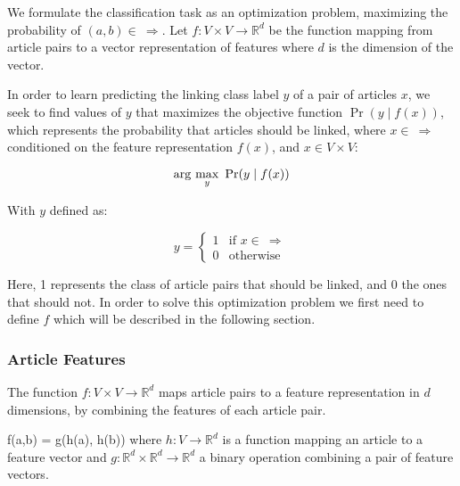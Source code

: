 We formulate the classification task as an optimization problem, maximizing the probability of $(a,b) \in \ \Rightarrow$. Let $f: V\times V \to \mathbb{R}^d$ be the function mapping from article pairs to a vector representation of features where $d$ is the dimension of the vector.

In order to learn predicting the linking class label $y$ of a pair of articles $x$,
we seek to find values of $y$ that maximizes the objective function $\Pr(y \mid f(x))$, which represents the probability that articles should be linked, where $x \in \ \Rightarrow$ conditioned on the feature representation $f(x)$, and $x \in V \times V$:

\begin{equation}
\label{objective}
\arg\ \!\max_y\ \Pr(y \mid f(x))
\end{equation}

With $y$ defined as:

\[
    y=
\begin{cases}
    1 & \text{if } x \in \  \Rightarrow\\
    0 & \text{otherwise}
\end{cases}
\]

Here, 1 represents the class of article pairs that should be linked, and 0 the ones that should not.
In order to solve this optimization problem we first need to define $f$ which will be described in the following section.

\subsubsection{Article Features}

The function $f: V\times V \to \mathbb{R}^d$ maps article pairs to a feature representation in $d$ dimensions, by combining the features of each article pair.

f(a,b) = g(h(a), h(b)) where $h: V \to \mathbb{R}^d$ is a function mapping an article to a feature vector and $g: \mathbb{R}^d \times \mathbb{R}^d \to \mathbb{R}^d$ a binary operation combining a pair of feature vectors.

